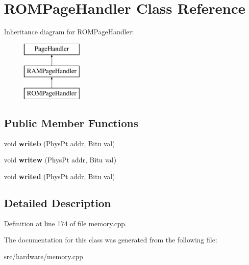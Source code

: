 \hypertarget{classROMPageHandler}{\section{R\-O\-M\-Page\-Handler Class Reference}
\label{classROMPageHandler}
}
Inheritance diagram for R\-O\-M\-Page\-Handler\-:\begin{figure}[H]
\begin{center}
\leavevmode
\includegraphics[height=3.000000cm]{classROMPageHandler}
\end{center}
\end{figure}
\subsection*{Public Member Functions}
\begin{DoxyCompactItemize}
\item 
\hypertarget{classROMPageHandler_aa90d31661b26c6a867783e3b8d299a43}{void {\bfseries writeb} (Phys\-Pt addr, Bitu val)}\label{classROMPageHandler_aa90d31661b26c6a867783e3b8d299a43}

\item 
\hypertarget{classROMPageHandler_a244bd425de97ffb60a1dbe3dfc513190}{void {\bfseries writew} (Phys\-Pt addr, Bitu val)}\label{classROMPageHandler_a244bd425de97ffb60a1dbe3dfc513190}

\item 
\hypertarget{classROMPageHandler_a47071afe3d028a424094077efe3356e5}{void {\bfseries writed} (Phys\-Pt addr, Bitu val)}\label{classROMPageHandler_a47071afe3d028a424094077efe3356e5}

\end{DoxyCompactItemize}


\subsection{Detailed Description}


Definition at line 174 of file memory.\-cpp.



The documentation for this class was generated from the following file\-:\begin{DoxyCompactItemize}
\item 
src/hardware/memory.\-cpp\end{DoxyCompactItemize}
